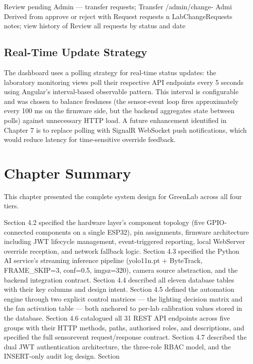 Review pending
Admin --- transfer requests;
Transfer /admin/change- Admi Derived from approve or reject with
Request requests n LabChangeRequests notes; view history of
Review all requests by status
and date




\subsection{Real-Time Update Strategy}


The dashboard uses a polling strategy for real-time status updates: the laboratory
monitoring views poll their respective API endpoints every 5 seconds using Angular's
interval-based observable pattern. This interval is configurable and was chosen to
balance freshness (the sensor-event loop fires approximately every 100 ms on the
firmware side, but the backend aggregates state between polls) against unnecessary
HTTP load. A future enhancement identified in Chapter 7 is to replace polling with
SignalR WebSocket push notifications, which would reduce latency for time-sensitive
override feedback.


\section{Chapter Summary}


This chapter presented the complete system design for GreenLab across all four tiers.

Section 4.2 specified the hardware layer's component topology (five GPIO-connected
components on a single ESP32), pin assignments, firmware architecture including JWT
lifecycle management, event-triggered reporting, local WebServer override reception,
and network fallback logic. Section 4.3 specified the Python AI service's streaming
inference pipeline (yolo11n.pt + ByteTrack, FRAME_SKIP=3, conf=0.5, imgsz=320), camera
source abstraction, and the backend integration contract. Section 4.4 described all eleven
database tables with their key columns and design intent. Section 4.5 defined the
automation engine through two explicit control matrices --- the lighting decision matrix
and the fan activation table --- both anchored to per-lab calibration values stored in the
database. Section 4.6 catalogued all 31 REST API endpoints across five groups with their
HTTP methods, paths, authorised roles, and descriptions, and specified the full sensorevent request/response contract. Section 4.7 described the dual JWT authentication
architecture, the three-role RBAC model, and the INSERT-only audit log design. Section
